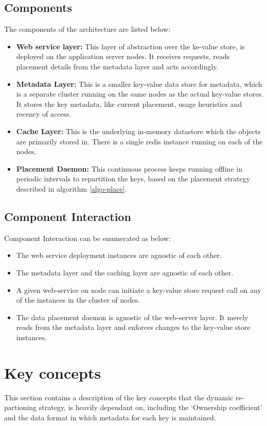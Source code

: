 \documentclass{sig-alternate}
\begin{document}
\subsection{Components}
The components of the architecture are listed below:
\begin{itemize}
	\item \textbf{Web service layer:} This layer of abstraction over the ke-value store, is deployed on the application server nodes. It receives requests, reads placement details from the metadata layer and acts accordingly.
	\item \textbf{Metadata Layer:} This is a smaller key-value data store for metadata, which is a separate cluster running on the same nodes as the actual key-value stores. It stores the key metadata, like current placement, usage heuristics and recency of access.
	\item \textbf{Cache Layer:} This is the underlying in-memory datastore which the objects are primarily stored in. There is a single redis instance running on each of the nodes.
	\item \textbf{Placement Daemon:} This continuous process keeps running offline in periodic intervals to repartition the keys, based on the placement strategy described in algorithm \ref{algo-place}.
\end{itemize}

\subsection{Component Interaction}
Component Interaction can be enumerated as below:
\begin{itemize}
	\item The web service deployment instances are agnostic of each other.
	\item The metadata layer and the caching layer are agnostic of each other.
	\item A given web-service on node can initiate a key-value store request call on any of the instances in the cluster of nodes.
	\item The data placement daemon is agnostic of the web-server layer. It merely reads from the metadata layer and enforces changes to the key-value store instances.
\end{itemize}


\section{Key concepts}
This section contains a description of the key concepts that the dynamic re-partioning strategy, is heavily dependant on, including the `Ownership coefficient' and the data format in which metadata for each key is maintained.
\end{document}
